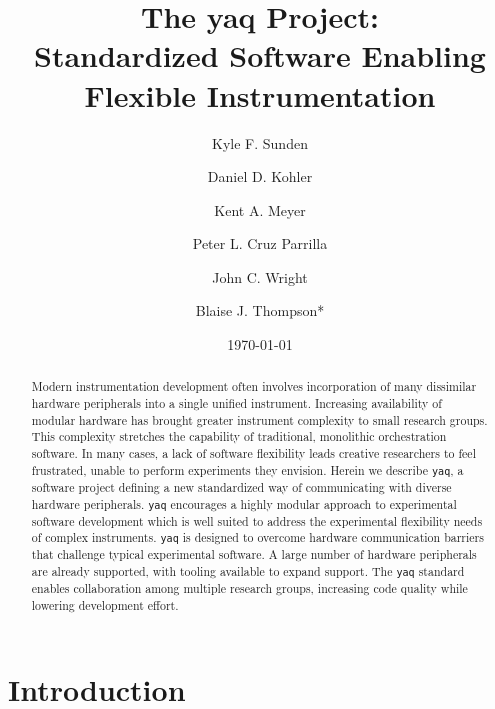\documentclass[aip, amsmath, amssymb, reprint,]{revtex4-2}
\newcommand\yaq{\texttt{yaq}}
\begin{document}

\title{The yaq Project: \\ Standardized Software Enabling Flexible Instrumentation}
\author{Kyle F. Sunden}
\author{Daniel D. Kohler}
\author{Kent A. Meyer}
\author{Peter L. Cruz Parrilla}
\author{John C. Wright}
\author{Blaise J. Thompson*}

\date{\today}

\begin{abstract}

Modern instrumentation development often involves incorporation of many dissimilar hardware peripherals into a single unified instrument.
Increasing availability of modular hardware has brought greater instrument complexity to small research groups.
This complexity stretches the capability of traditional, monolithic orchestration software.
In many cases, a lack of software flexibility leads creative researchers to feel frustrated, unable to perform experiments they envision.
Herein we describe \yaq{}, a software project defining a new standardized way of communicating with diverse hardware peripherals.
\yaq{} encourages a highly modular approach to experimental software development which is well suited to address the experimental flexibility needs of complex instruments.
\yaq{} is designed to overcome hardware communication barriers that challenge typical experimental software.
A large number of hardware peripherals are already supported, with tooling available to expand support.
The \yaq{} standard enables collaboration among multiple research groups, increasing code quality while lowering development effort.

\end{abstract}

\maketitle

\section{Introduction}
\end{document}
